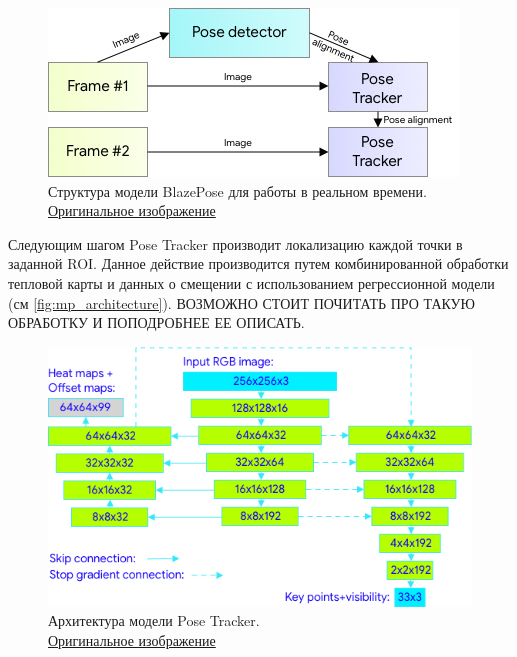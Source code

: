 \begin{figure}[h]
	\centering
	\includegraphics[width=\textwidth * 4 / 5]{./images/MPPose/Model_structure.jpg}
	\caption{Структура модели BlazePose для работы в реальном времени.\\ \href{https://1.bp.blogspot.com/-J66lTDBjlgw/XzVwzgeQJ7I/AAAAAAAAGYM/WBIhbOqzi4ICUswEOHv8r7ItJIOJgL9iwCLcBGAsYHQ/s411/image11.jpg}{Оригинальное изображение}}
	\label{fig:mp_model_structure}
\end{figure}

Следующим шагом Pose Tracker производит локализацию каждой точки в заданной ROI. Данное действие производится путем комбинированной обработки тепловой карты и данных о смещении с использованием регрессионной модели (см \autoref{fig:mp_architecture}). ВОЗМОЖНО СТОИТ ПОЧИТАТЬ ПРО ТАКУЮ ОБРАБОТКУ И ПОПОДРОБНЕЕ ЕЕ ОПИСАТЬ.

\begin{figure}[h]
	\centering
	\includegraphics[width=\textwidth * 4 / 5]{./images/MPPose/architecture.jpg}
	\caption{Архитектура модели Pose Tracker.\\ \href{https://1.bp.blogspot.com/-XxKesnBALGM/XzVxSKZNWZI/AAAAAAAAGYc/WOt31icjp_YyjMxz06RSEwTi9K3qviFxwCLcBGAsYHQ/s550/image9.jpg}{Оригинальное изображение}}
	\label{fig:mp_architecture}
\end{figure}

